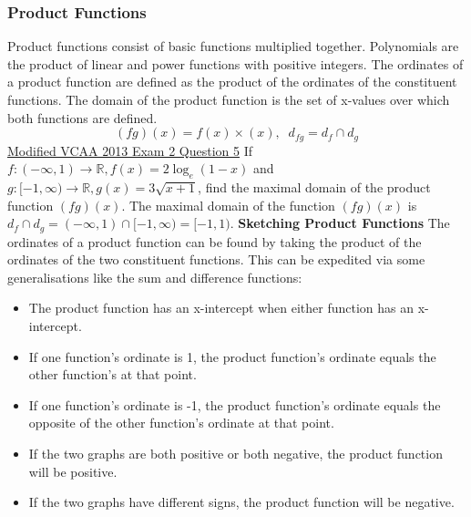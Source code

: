 \documentclass{article}
\begin{document}
			\subsubsection{Product Functions}
				Product functions consist of basic functions multiplied together. Polynomials are the product of linear and power functions with positive integers.\newline\newline
				The ordinates of a product function are defined as the product of the ordinates of the constituent functions. The domain of the product function is the set of x-values over which both functions are defined.\newline
				\[(fg)(x)=f(x)\times(x),\;\;d_{fg}=d_f\cap d_g\]
				\underline{Modified VCAA 2013 Exam 2 Question 5}\newline
				If $f: (-\infty,1)\to\mathbb{R},f(x)=2\log_e(1-x)$ and $g: [-1,\infty)\to\mathbb{R},g(x)=3\sqrt{x+1}$, find the maximal domain of the product function $(fg)(x)$.\newline\newline
				The maximal domain of the function $(fg)(x)$ is $d_f\cap d_g = (-\infty,1)\cap[-1,\infty)=[-1,1)$.\newline\newline
				\textbf{Sketching Product Functions}\newline
				The ordinates of a product function can be found by taking the product of the ordinates of the two constituent functions. This can be expedited via some generalisations like the sum and difference functions:\newline
				\begin{itemize}
					\item The product function has an x-intercept when either function has an x-intercept.
					\item If one function's ordinate is 1, the product function's ordinate equals the other function's at that point.
					\item If one function's ordinate is -1, the product function's ordinate equals the opposite of the other function's ordinate at that point.
					\item If the two graphs are both positive or both negative, the product function will be positive.
					\item If the two graphs have different signs, the product function will be negative.
				\end{itemize}
\end{document}
